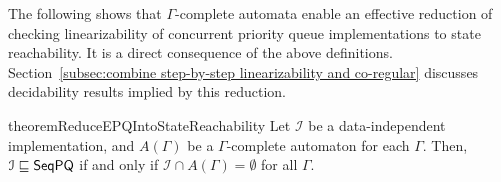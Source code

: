 The following shows that $\Gamma$-complete automata enable an effective reduction of checking linearizability of concurrent priority queue implementations to state reachability. It is a direct consequence of the above definitions. Section~\ref{subsec:combine step-by-step linearizability and co-regular} discusses decidability results implied by this reduction.

\begin{restatable}{theorem}{ReduceEPQIntoStateReachability}
\label{lemma:reduce EPQ into state reachability}
Let $\mathcal{I}$ be a data-independent implementation, and $A(\Gamma)$ be a $\Gamma$-complete automaton for each $\Gamma$. Then,
$\mathcal{I} \sqsubseteq \mathsf{SeqPQ}$ if and only if $\mathcal{I} \cap A(\Gamma) = \emptyset$ for all $\Gamma$.
\end{restatable}






%
%
%
%
%
%
%
%
%
%
%
%
%
%



